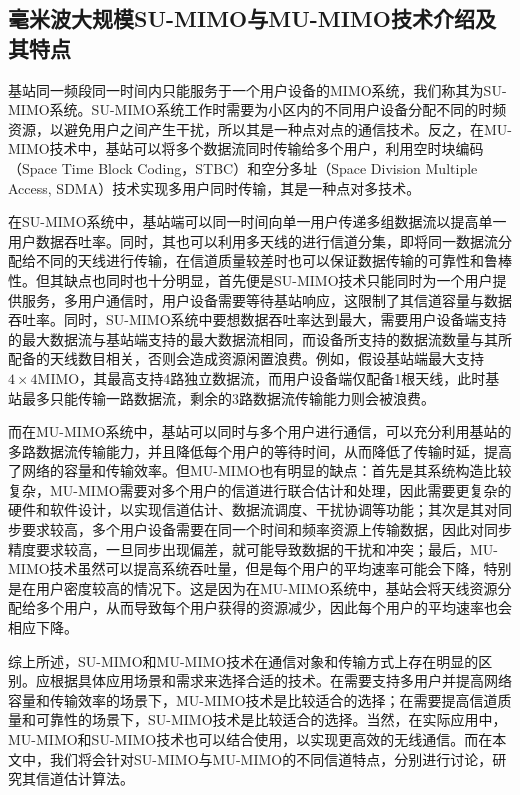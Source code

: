 \documentclass{xdupgthesis}
\begin{document}
\subsection{毫米波大规模SU-MIMO与MU-MIMO技术介绍及其特点}
基站同一频段同一时间内只能服务于一个用户设备的MIMO系统，我们称其为SU-MIMO系统。SU-MIMO系统工作时需要为小区内的不同用户设备分配不同的时频资源，以避免用户之间产生干扰，所以其是一种点对点的通信技术。反之，在MU-MIMO技术中，基站可以将多个数据流同时传输给多个用户，利用空时块编码（Space Time Block Coding，STBC）和空分多址（Space Division Multiple Access, SDMA）技术实现多用户同时传输，其是一种点对多技术\parencite{lu2014overview,li2010mimo}。

在SU-MIMO系统中，基站端可以同一时间向单一用户传递多组数据流以提高单一用户数据吞吐率。同时，其也可以利用多天线的进行信道分集，即将同一数据流分配给不同的天线进行传输，在信道质量较差时也可以保证数据传输的可靠性和鲁棒性。但其缺点也同时也十分明显，首先便是SU-MIMO技术只能同时为一个用户提供服务，多用户通信时，用户设备需要等待基站响应，这限制了其信道容量与数据吞吐率。同时，SU-MIMO系统中要想数据吞吐率达到最大，需要用户设备端支持的最大数据流与基站端支持的最大数据流相同，而设备所支持的数据流数量与其所配备的天线数目相关，否则会造成资源闲置浪费。例如，假设基站端最大支持$4\times4$MIMO，其最高支持4路独立数据流，而用户设备端仅配备1根天线，此时基站最多只能传输一路数据流，剩余的3路数据流传输能力则会被浪费。

而在MU-MIMO系统中，基站可以同时与多个用户进行通信，可以充分利用基站的多路数据流传输能力，并且降低每个用户的等待时间，从而降低了传输时延，提高了网络的容量和传输效率\parencite{li2010mimo}。但MU-MIMO也有明显的缺点：首先是其系统构造比较复杂，MU-MIMO需要对多个用户的信道进行联合估计和处理，因此需要更复杂的硬件和软件设计，以实现信道估计、数据流调度、干扰协调等功能；其次是其对同步要求较高，多个用户设备需要在同一个时间和频率资源上传输数据，因此对同步精度要求较高，一旦同步出现偏差，就可能导致数据的干扰和冲突；最后，MU-MIMO技术虽然可以提高系统吞吐量，但是每个用户的平均速率可能会下降，特别是在用户密度较高的情况下。这是因为在MU-MIMO系统中，基站会将天线资源分配给多个用户，从而导致每个用户获得的资源减少，因此每个用户的平均速率也会相应下降\parencite{liu2012downlink}。

综上所述，SU-MIMO和MU-MIMO技术在通信对象和传输方式上存在明显的区别。应根据具体应用场景和需求来选择合适的技术。在需要支持多用户并提高网络容量和传输效率的场景下，MU-MIMO技术是比较适合的选择；在需要提高信道质量和可靠性的场景下，SU-MIMO技术是比较适合的选择。当然，在实际应用中，MU-MIMO和SU-MIMO技术也可以结合使用，以实现更高效的无线通信。而在本文中，我们将会针对SU-MIMO与MU-MIMO的不同信道特点，分别进行讨论，研究其信道估计算法。
\end{document}
